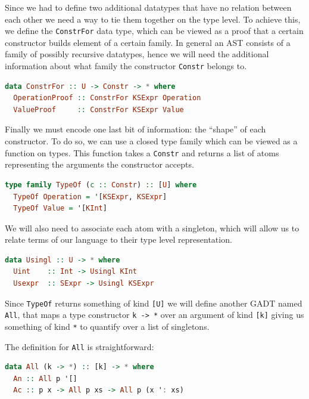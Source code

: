 \documentclass[11pt]{article}
\begin{document}
Since we had to define two additional datatypes that have no relation between 
each other we need a way to tie them together on the type level.
To achieve this, we define the \texttt{ConstrFor} data type,
which can be viewed as a proof that a certain constructor builds element
of a certain family. In general an AST consists of a family of possibly 
recursive datatypes, hence we will need the additional information about what 
family the constructor \texttt{Constr} belongs to.

\begin{lstlisting}[language=haskell]
data ConstrFor :: U -> Constr -> * where
  OperationProof :: ConstrFor KSExpr Operation
  ValueProof     :: ConstrFor KSExpr Value
\end{lstlisting}

Finally we must encode one last bit of information: the ``shape'' of
each constructor. To do so, we can use a closed type family which can be
viewed as a function on types. This function takes a \texttt{Constr} and
returns a list of atoms representing the arguments the constructor
accepts.

\begin{lstlisting}[language=haskell]
type family TypeOf (c :: Constr) :: [U] where
  TypeOf Operation = '[KSExpr, KSExpr]
  TypeOf Value = '[KInt]
\end{lstlisting}

We will also need to associate each atom with a singleton, which will
allow us to relate terms of our language to their type level representation. 

\begin{lstlisting}[language=haskell]
data Usingl :: U -> * where
  Uint    :: Int -> Usingl KInt
  Usexpr  :: SExpr -> Usingl KSExpr
\end{lstlisting}

Since \texttt{TypeOf} returns something of kind \texttt{{[}U{]}} we will
define another GADT named \texttt{All}, that maps a type constructor
\texttt{k\ -\textgreater{}\ *} over an argument of kind \texttt{{[}k{]}}
giving us something of kind \texttt{*} to quantify over a list of singletons.

The definition for \texttt{All} is straightforward:

\begin{lstlisting}[language=haskell]
data All (k -> *) :: [k] -> * where
  An :: All p '[]
  Ac :: p x -> All p xs -> All p (x ': xs)
\end{lstlisting}
\end{document}
